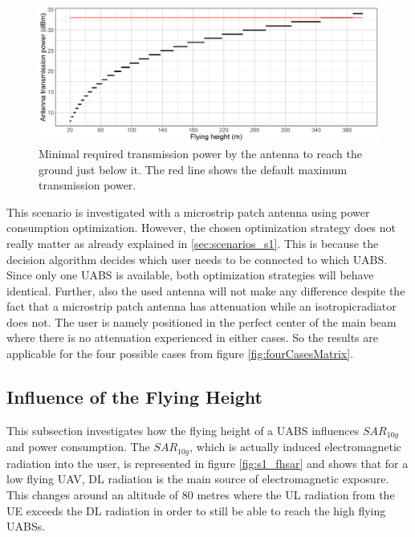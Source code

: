 \begin{figure}[h]
  \centering
  \includegraphics[width=\textwidth]{../results/s1/ptx.png}
  \caption{Minimal required transmission power by the antenna to reach the ground just below it. The red line shows the default maximum transmission power.}
  \label{fig:ptxfh}
\end{figure}

This scenario is investigated with a microstrip patch antenna using power consumption optimization. 
 However, the chosen optimization strategy does not really matter as already explained in  \ref{sec:scenarios_s1}. This is because the decision 
 algorithm decides which user 
needs to be connected to which \gls{UABS}. Since only one \gls{UABS} is available, both optimization strategies will behave identical.
Further, also the used antenna will not make any difference
despite the fact that a microstrip patch antenna has attenuation while an \gls{isotropicradiator} does not.
The user is namely positioned in the perfect center of the main beam where there is 
no attenuation experienced in either cases. So the results are applicable for the four possible cases from figure \ref{fig:fourCasesMatrix}.

\FloatBarrier
\subsection{Influence of the Flying Height}
\label{sub:senario1_influenceOfFlyHeight}

This subsection investigates how the flying height of a \gls{UABS} influences $SAR_{10g}$ and power consumption.
The $SAR_{10g}$, which is actually induced electromagnetic radiation into the user, is represented in figure \ref{fig:s1_fhsar}
and shows that for a low flying \gls{UAV}, \gls{DL} radiation is the main source of electromagnetic exposure.
This changes around an altitude of 80 metres where the \gls{UL} radiation from the \gls{UE}
exceeds the \gls{DL} radiation in order to still be able to reach the high flying \gls{UABS}s.


